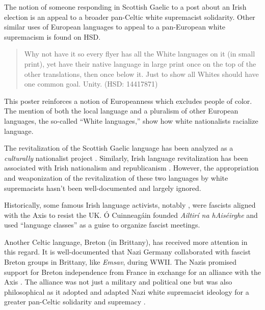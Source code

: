 \documentclass[output=paper,colorlinks,citecolor=brown]{langscibook}
\begin{document}
The notion of someone responding in Scottish Gaelic to a post about an Irish election is an appeal to a broader pan\hyp Celtic white supremacist solidarity. Other similar uses of European languages to appeal to a pan-European white supremacism is found on HSD.

\begin{quote}
Why not have it so every flyer has all the White languages on it (in small print), yet have their native language in large print once on the top of the other translations, then once below it. Just to show all Whites should have one common goal. Unity. (HSD: 14417871) 
\end{quote}

\noindent This poster reinforces a notion of Europeanness which excludes people of color. The mention of both the local language and a pluralism of other European languages, the so-called ``White languages,'' show how white nationalists racialize language.

The revitalization of the  Scottish Gaelic language has been analyzed as a \emph{culturally} nationalist project \citep{jp:McEwan-Fujita1997}. Similarly, Irish language revitalization has been associated with Irish nationalism and republicanism \citep{jp:Zenker2012}. However, the appropriation and weaponization of the revitalization of these two languages by white supremacists hasn't been well-documented and largely ignored.

Historically, some famous Irish language activists, notably , were fascists aligned with the Axis to resist the UK. Ó Cuinneagáin founded \textit{Ailtirí na hAiséirghe} and used “language classes” as a guise to organize fascist meetings.

Another Celtic language, Breton (in Brittany), has received more attention in this regard. It is well-documented that Nazi Germany collaborated with fascist Breton groups in Brittany, like \textit{Emsav}, during WWII. The Nazis promised support for Breton independence from France in exchange for an alliance with the Axis \citep{jp:Leach2010}. The alliance was not just a military and political one but was also philosophical as it adopted and adapted Nazi white supremacist ideology for a greater pan-Celtic solidarity and supremacy \citep{jp:Leach2010}.
\end{document}
